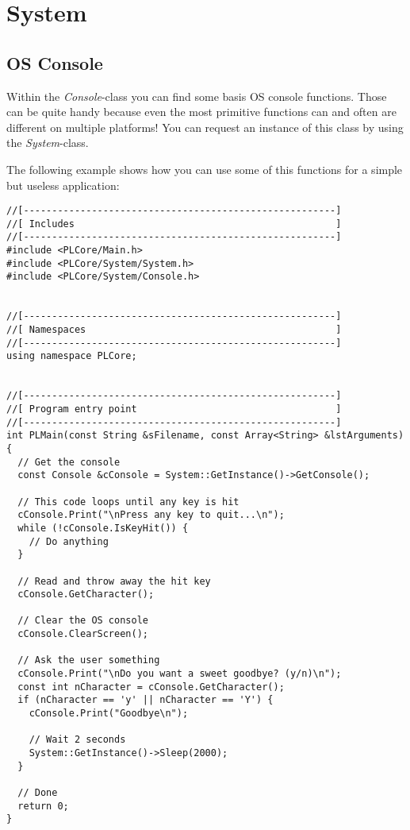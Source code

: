 \section{System}




\subsection{OS Console}
Within the \emph{Console}-class you can find some basis OS console functions. Those can be quite handy because even the most primitive functions can and often are different on multiple platforms! You can request an instance of this class by using the \emph{System}-class.

The following example shows how you can use some of this functions for a simple but useless application:

\begin{lstlisting}[caption=OS console usage example]
//[-------------------------------------------------------]
//[ Includes                                              ]
//[-------------------------------------------------------]
#include <PLCore/Main.h>
#include <PLCore/System/System.h>
#include <PLCore/System/Console.h>


//[-------------------------------------------------------]
//[ Namespaces                                            ]
//[-------------------------------------------------------]
using namespace PLCore;


//[-------------------------------------------------------]
//[ Program entry point                                   ]
//[-------------------------------------------------------]
int PLMain(const String &sFilename, const Array<String> &lstArguments)
{
  // Get the console
  const Console &cConsole = System::GetInstance()->GetConsole();

  // This code loops until any key is hit
  cConsole.Print("\nPress any key to quit...\n");
  while (!cConsole.IsKeyHit()) {
    // Do anything
  }

  // Read and throw away the hit key
  cConsole.GetCharacter();

  // Clear the OS console
  cConsole.ClearScreen();

  // Ask the user something
  cConsole.Print("\nDo you want a sweet goodbye? (y/n)\n");
  const int nCharacter = cConsole.GetCharacter();
  if (nCharacter == 'y' || nCharacter == 'Y') {
    cConsole.Print("Goodbye\n");

    // Wait 2 seconds
    System::GetInstance()->Sleep(2000);
  }

  // Done
  return 0;
}
\end{lstlisting}
